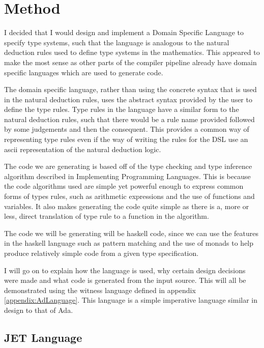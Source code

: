 \chapter{Method}
I decided that I would design and implement a Domain Specific Language to specify type systems, such that the language is analogous to the natural deduction rules used to define type systems in the mathematics.
This appeared to make the most sense as other parts of the compiler pipeline already have domain specific languages which are used to generate code.

The domain specific language, rather than using the concrete syntax that is used in the natural deduction rules, uses the abstract syntax provided by the user to define the type rules.
Type rules in the language have a similar form to the natural deduction rules, such that there would be a rule name provided followed by some judgements and then the consequent.
This provides a common way of representing type rules even if the way of writing the rules for the DSL use an ascii representation of the natural deduction logic.

The code we are generating is based off of the type checking and type inference algorithm described in Implementing Programming Languages\cite{ranta2012implementing}.
This is because the code algorithms used are simple yet powerful enough to express common forms of types rules, such as arithmetic expressions and the use of functions and variables.
It also makes generating the code quite simple as there is a, more or less, direct translation of type rule to a function in the algorithm.

The code we will be generating will be haskell code, since we can use the features in the haskell language such as pattern matching and the use of monads to help produce relatively simple code from a given type specification.

I will go on to explain how the language is used, why certain design decisions were made and what code is generated from the input source.
This will all be demonstrated using the witness language defined in appendix \ref{appendix:AdLanguage}.
This language is a simple imperative language similar in design to that of Ada.

\section{JET Language}

